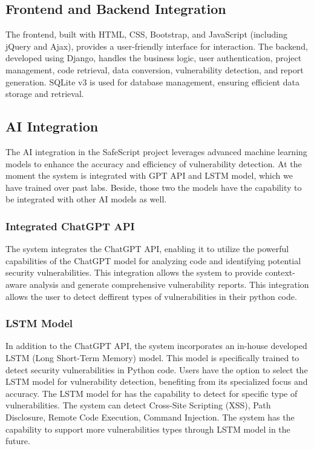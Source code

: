 \subsection{Frontend and Backend Integration}
The frontend, built with HTML, CSS, Bootstrap, and JavaScript (including jQuery and Ajax), provides a user-friendly interface for interaction. 
The backend, developed using Django, handles the business logic, user authentication, project management, code retrieval, data conversion, vulnerability detection, and report generation. 
SQLite v3 is used for database management, ensuring efficient data storage and retrieval.

\subsection{AI Integration}
The AI integration in the SafeScript project leverages advanced machine learning models to enhance the accuracy and efficiency of vulnerability detection. 
At the moment the system is integrated with GPT API and LSTM model, which we have trained over past labs. 
Beside, those two the models have the capability to be integrated with other AI models as well.

\subsubsection{Integrated ChatGPT API}
The system integrates the ChatGPT API, enabling it to utilize the powerful capabilities of the ChatGPT model for analyzing code and identifying potential security vulnerabilities. 
This integration allows the system to provide context-aware analysis and generate comprehensive vulnerability reports.
This integration allows the user to detect deffirent types of vulnerabilities in their python code.

\subsubsection{LSTM Model}
In addition to the ChatGPT API, the system incorporates an in-house developed LSTM (Long Short-Term Memory) model. 
This model is specifically trained to detect security vulnerabilities in Python code. 
Users have the option to select the LSTM model for vulnerability detection, benefiting from its specialized focus and accuracy.
The LSTM model for has the capability to detect for specific type of vulnerabilities. The system can detect Cross-Site Scripting (XSS), Path Disclosure, Remote Code Execution, Command Injection.
The system has the capability to support more vulnerabilities types through LSTM model in the future.

